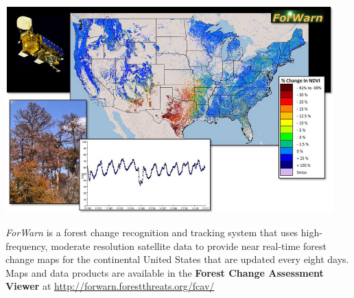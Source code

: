 \begin{frame}
 \begin{center}
  \vskip-0.13cm
  \includegraphics[width=0.95\textwidth]{figures/ForWarnUS.jpg}
 \end{center}
 \vskip-0.13cm
 \vbox{\footnotesize \textit{ForWarn} is a forest change recognition and tracking system that uses high-frequency, moderate resolution satellite data to provide near real-time forest change maps for the continental United States that are updated every eight days.  Maps and data products are available in the \textbf{Forest Change Assessment Viewer} at \url{http://forwarn.forestthreats.org/fcav/}}
\end{frame}


